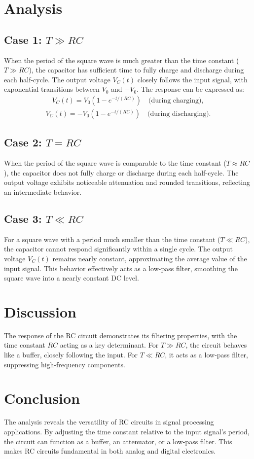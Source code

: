 \documentclass[12pt]{article}
\begin{document}
\section{Analysis}
\subsection{Case 1: $T \gg RC$}
When the period of the square wave is much greater than the time constant ($T \gg RC$), the capacitor has sufficient time to fully charge and discharge during each half-cycle. The output voltage $V_C(t)$ closely follows the input signal, with exponential transitions between $V_0$ and $-V_0$. The response can be expressed as:
\begin{align}
    V_C(t) = V_0 \left(1 - e^{-t/(RC)}\right) \quad \text{(during charging)},
\end{align}
\begin{align}
    V_C(t) = -V_0 \left(1 - e^{-t/(RC)}\right) \quad \text{(during discharging)}.
\end{align}

\subsection{Case 2: $T = RC$}
When the period of the square wave is comparable to the time constant ($T \approx RC$), the capacitor does not fully charge or discharge during each half-cycle. The output voltage exhibits noticeable attenuation and rounded transitions, reflecting an intermediate behavior.

\subsection{Case 3: $T \ll RC$}
For a square wave with a period much smaller than the time constant ($T \ll RC$), the capacitor cannot respond significantly within a single cycle. The output voltage $V_C(t)$ remains nearly constant, approximating the average value of the input signal. This behavior effectively acts as a low-pass filter, smoothing the square wave into a nearly constant DC level.

\section{Discussion}
The response of the RC circuit demonstrates its filtering properties, with the time constant $RC$ acting as a key determinant. For $T \gg RC$, the circuit behaves like a buffer, closely following the input. For $T \ll RC$, it acts as a low-pass filter, suppressing high-frequency components.

\section{Conclusion}
The analysis reveals the versatility of RC circuits in signal processing applications. By adjusting the time constant relative to the input signal's period, the circuit can function as a buffer, an attenuator, or a low-pass filter. This makes RC circuits fundamental in both analog and digital electronics.
\end{document}
